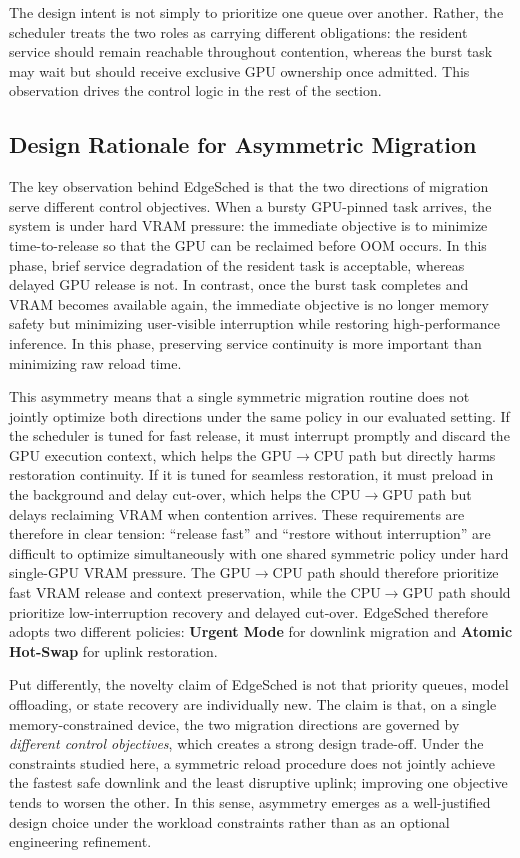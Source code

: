 The design intent is not simply to prioritize one queue over another. Rather, the scheduler treats the two roles as carrying different obligations: the resident service should remain reachable throughout contention, whereas the burst task may wait but should receive exclusive GPU ownership once admitted. This observation drives the control logic in the rest of the section.


\subsection{Design Rationale for Asymmetric Migration}

The key observation behind EdgeSched is that the two directions of migration serve different control objectives. When a bursty GPU-pinned task arrives, the system is under hard VRAM pressure: the immediate objective is to minimize time-to-release so that the GPU can be reclaimed before OOM occurs. In this phase, brief service degradation of the resident task is acceptable, whereas delayed GPU release is not. In contrast, once the burst task completes and VRAM becomes available again, the immediate objective is no longer memory safety but minimizing user-visible interruption while restoring high-performance inference. In this phase, preserving service continuity is more important than minimizing raw reload time.

This asymmetry means that a single symmetric migration routine does not jointly optimize both directions under the same policy in our evaluated setting. If the scheduler is tuned for fast release, it must interrupt promptly and discard the GPU execution context, which helps the GPU$\rightarrow$CPU path but directly harms restoration continuity. If it is tuned for seamless restoration, it must preload in the background and delay cut-over, which helps the CPU$\rightarrow$GPU path but delays reclaiming VRAM when contention arrives. These requirements are therefore in clear tension: ``release fast'' and ``restore without interruption'' are difficult to optimize simultaneously with one shared symmetric policy under hard single-GPU VRAM pressure. The GPU$\rightarrow$CPU path should therefore prioritize fast VRAM release and context preservation, while the CPU$\rightarrow$GPU path should prioritize low-interruption recovery and delayed cut-over. EdgeSched therefore adopts two different policies: \textbf{Urgent Mode} for downlink migration and \textbf{Atomic Hot-Swap} for uplink restoration.

Put differently, the novelty claim of EdgeSched is not that priority queues, model offloading, or state recovery are individually new. The claim is that, on a single memory-constrained device, the two migration directions are governed by \emph{different control objectives}, which creates a strong design trade-off. Under the constraints studied here, a symmetric reload procedure does not jointly achieve the fastest safe downlink and the least disruptive uplink; improving one objective tends to worsen the other. In this sense, asymmetry emerges as a well-justified design choice under the workload constraints rather than as an optional engineering refinement.

